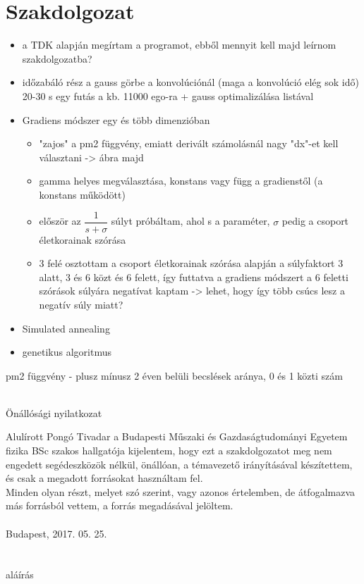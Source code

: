 \documentclass[12pt]{article}
\begin{document}
\section*{Szakdolgozat}
\begin{itemize}
	\item a TDK alapján megírtam a programot, ebből mennyit kell majd leírnom szakdolgozatba?
	\item időzabáló rész a gauss görbe a konvolúciónál (maga a konvolúció elég sok idő) 20-30 s egy futás a kb. 11000 ego-ra + gauss optimalizálása listával
	\item Gradiens módszer egy és több dimenzióban
	\begin{itemize}
		\item "zajos" a pm2 függvény, emiatt derivált számolásnál nagy "dx"-et kell választani -> ábra majd
		\item gamma helyes megválasztása, konstans vagy függ a gradienstől (a konstans működött)
		\item először az $\dfrac{1}{s + \sigma}$ súlyt próbáltam, ahol s a paraméter, $\sigma$ pedig a csoport életkorainak szórása
		\item 3 felé osztottam a csoport életkorainak szórása alapján a súlyfaktort 3 alatt, 3 és 6 közt és 6 felett, így futtatva a gradiens módszert a 6 feletti szórások súlyára negatívat kaptam -> lehet, hogy így több csúcs lesz a negatív súly miatt?
	\end{itemize}
	\item Simulated annealing
	\item genetikus algoritmus
\end{itemize}
pm2 függvény - plusz mínusz 2 éven belüli becslések aránya, 0 és 1 közti szám \\ \\
\fi


\pagebreak
\begin{center}
	{\Huge Önállósági nyilatkozat}
\end{center}
\medskip
Alulírott Pongó Tivadar a Budapesti Műszaki és Gazdaságtudományi Egyetem fizika BSc szakos hallgatója kijelentem, hogy ezt a szakdolgozatot meg nem engedett segédeszközök nélkül, önállóan, a témavezető irányításával készítettem, és csak a megadott forrásokat használtam fel. \\
Minden olyan részt, melyet szó szerint, vagy azonos értelemben, de átfogalmazva más forrásból vettem, a forrás megadásával jelöltem.\\\\
Budapest, 2017. 05. 25. \\ \\ \\ %
\hspace*{100mm}aláírás %
\pagebreak
\tableofcontents
\pagebreak
\end{document}
